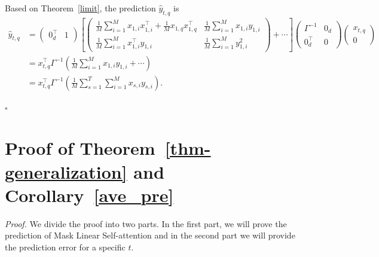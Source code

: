 \documentclass{article}
\theoremstyle{plain}
\theoremstyle{definition}
\theoremstyle{remark}
\begin{document}
Based on Theorem~\ref{limit}, the prediction $\hat{y}_{t,q}$ is
\begin{align*}
    \hat{y}_{t,q} &= \begin{pmatrix}
    0_d^\top & 1
\end{pmatrix}
[\begin{pmatrix}
 \frac{1}{M}\sum_{i=1}^Mx_{1,i}x^\top_{1,i}+\frac{1}{M}x_{1,q}x_{1,q}^\top & \frac{1}{M}\sum_{i=1}^{M}x_{1,i}y_{1,i}\\
 \frac{1}{M}\sum_{i=1}^Mx_{1,i}^\top y_{1,i} &\frac{1}{M}\sum_{i=1}^M y^2_{1,i}
\end{pmatrix}+\cdots]
\begin{pmatrix}
    \Gamma^{-1} & 0_d \\ 0_d^\top & 0
\end{pmatrix}\begin{pmatrix}
    x_{t,q} \\ 0
\end{pmatrix}\\
&=x_{t,q}^\top\Gamma^{-1}\left(\frac{1}{M}\sum_{i=1}^Mx_{1,i}y_{1,i}+\cdots\right)\\
&=x_{t,q}^\top\Gamma^{-1}\left(\frac{1}{M}\sum_{s=1}^T\sum_{i=1}^M x_{s,i}y_{s,i}\right).
\end{align*}

\hfill$\square$


\vspace{-0.1in}\section{Proof of Theorem~\ref{thm-generalization} and Corollary~\ref{ave_pre}}
\label{proof_generalization}
\textit{Proof.} We divide the proof into two parts. In the first part, we will prove the prediction of Mask Linear Self-attention and in the second part we will provide the prediction error for a specific $t$.
\end{document}
